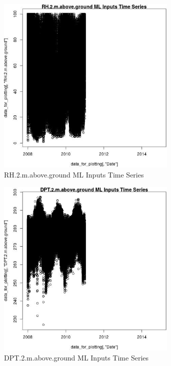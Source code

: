 \begin{figure} 
\centering  
\includegraphics[width=0.77\textwidth]{Code_Outputs/ML_input_report_ML_input_PM25_Step5_part_d_de_duplicated_aves_ML_input_RH2mabovegroundvDate.jpg} 
\caption{\label{fig:ML_input_report_ML_input_PM25_Step5_part_d_de_duplicated_aves_ML_inputRH2mabovegroundvDate}RH.2.m.above.ground ML Inputs Time Series} 
\end{figure} 
 

\begin{figure} 
\centering  
\includegraphics[width=0.77\textwidth]{Code_Outputs/ML_input_report_ML_input_PM25_Step5_part_d_de_duplicated_aves_ML_input_DPT2mabovegroundvDate.jpg} 
\caption{\label{fig:ML_input_report_ML_input_PM25_Step5_part_d_de_duplicated_aves_ML_inputDPT2mabovegroundvDate}DPT.2.m.above.ground ML Inputs Time Series} 
\end{figure} 
 

